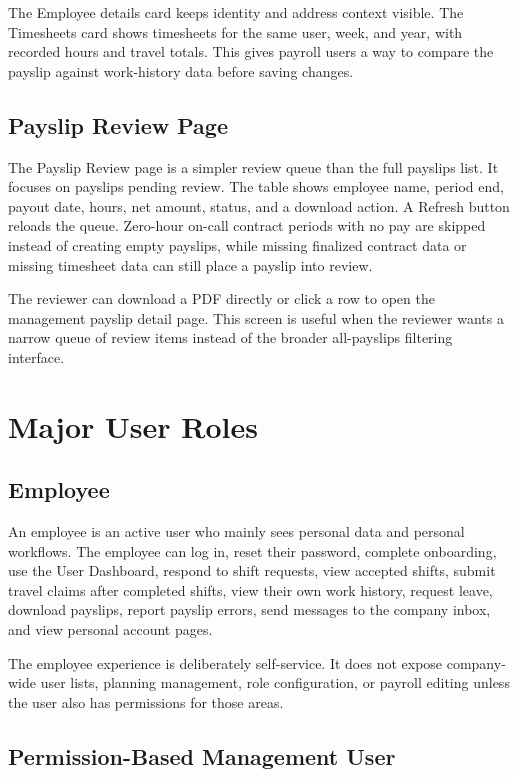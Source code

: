 \documentclass[11pt]{article}
\begin{document}
The Employee details card keeps identity and address context visible. The Timesheets card shows timesheets for the same user, week, and year, with recorded hours and travel totals. This gives payroll users a way to compare the payslip against work-history data before saving changes.
\subsection{Payslip Review Page}

The Payslip Review page is a simpler review queue than the full payslips list. It focuses on payslips pending review. The table shows employee name, period end, payout date, hours, net amount, status, and a download action. A Refresh button reloads the queue. Zero-hour on-call contract periods with no pay are skipped instead of creating empty payslips, while missing finalized contract data or missing timesheet data can still place a payslip into review.

The reviewer can download a PDF directly or click a row to open the management payslip detail page. This screen is useful when the reviewer wants a narrow queue of review items instead of the broader all-payslips filtering interface.

\section{Major User Roles}

\subsection{Employee}

An employee is an active user who mainly sees personal data and personal workflows. The employee can log in, reset their password, complete onboarding, use the User Dashboard, respond to shift requests, view accepted shifts, submit travel claims after completed shifts, view their own work history, request leave, download payslips, report payslip errors, send messages to the company inbox, and view personal account pages.

The employee experience is deliberately self-service. It does not expose company-wide user lists, planning management, role configuration, or payroll editing unless the user also has permissions for those areas.

\subsection{Permission-Based Management User}
\end{document}
